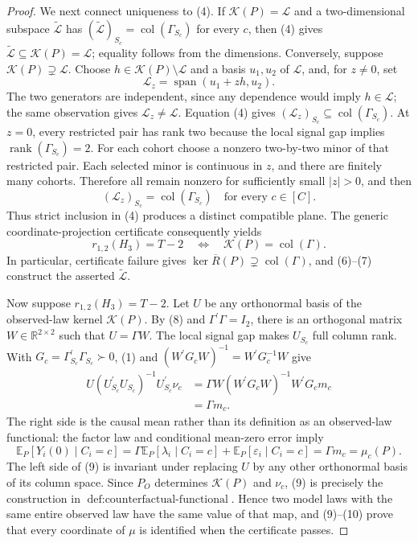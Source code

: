 \documentclass{article}
\begin{document}
\begin{proof}
We next connect uniqueness to (4). If \(\mathcal K(P)=\mathcal L\) and a two-dimensional subspace \(\widetilde{\mathcal L}\) has \((\widetilde{\mathcal L})_{S_c}=\operatorname{col}(\Gamma_{S_c})\) for every \(c\), then (4) gives \(\widetilde{\mathcal L}\subseteq\mathcal K(P)=\mathcal L\); equality follows from the dimensions. Conversely, suppose \(\mathcal K(P)\supsetneq\mathcal L\). Choose \(h\in\mathcal K(P)\setminus\mathcal L\) and a basis \(u_1,u_2\) of \(\mathcal L\), and, for \(z\neq0\), set
\[
\mathcal L_z=\operatorname{span}(u_1+zh,u_2).
\tag{6}
\]
The two generators are independent, since any dependence would imply \(h\in\mathcal L\); the same observation gives \(\mathcal L_z\neq\mathcal L\). Equation (4) gives \((\mathcal L_z)_{S_c}\subseteq\operatorname{col}(\Gamma_{S_c})\). At \(z=0\), every restricted pair has rank two because the local signal gap implies \(\operatorname{rank}(\Gamma_{S_c})=2\). For each cohort choose a nonzero two-by-two minor of that restricted pair. Each selected minor is continuous in \(z\), and there are finitely many cohorts. Therefore all remain nonzero for sufficiently small \(|z|>0\), and then
\[
(\mathcal L_z)_{S_c}=\operatorname{col}(\Gamma_{S_c})
\quad\text{for every }c\in[C].
\tag{7}
\]
Thus strict inclusion in (4) produces a distinct compatible plane. The generic coordinate-projection certificate consequently yields
\[
r_{1,2}(H_3)=T-2
\quad\Longleftrightarrow\quad
\mathcal K(P)=\operatorname{col}(\Gamma).
\tag{8}
\]
In particular, certificate failure gives \(\ker\overline R(P)\supsetneq\operatorname{col}(\Gamma)\), and (6)--(7) construct the asserted \(\widetilde{\mathcal L}\).

Now suppose \(r_{1,2}(H_3)=T-2\). Let \(U\) be any orthonormal basis of the observed-law kernel \(\mathcal K(P)\). By (8) and \(\Gamma^{\prime}\Gamma=I_2\), there is an orthogonal matrix \(W\in\mathbb R^{2\times2}\) such that \(U=\Gamma W\). The local signal gap makes \(U_{S_c}\) full column rank. With \(G_c=\Gamma_{S_c}^{\prime}\Gamma_{S_c}\succ0\), (1) and \((W^{\prime}G_cW)^{-1}=W^{\prime}G_c^{-1}W\) give
\[
\begin{aligned}
U(U_{S_c}^{\prime}U_{S_c})^{-1}U_{S_c}^{\prime}\nu_c
&=\Gamma W(W^{\prime}G_cW)^{-1}W^{\prime}G_cm_c\\
&=\Gamma m_c.
\end{aligned}
\tag{9}
\]
The right side is the causal mean rather than its definition as an observed-law functional: the factor law and conditional mean-zero error imply
\[
\mathbb E_P[Y_i(0)\mid C_i=c]
=\Gamma\mathbb E_P[\lambda_i\mid C_i=c]
+\mathbb E_P[\varepsilon_i\mid C_i=c]
=\Gamma m_c=\mu_c(P).
\tag{10}
\]
The left side of (9) is invariant under replacing \(U\) by any other orthonormal basis of its column space. Since \(P_O\) determines \(\mathcal K(P)\) and \(\nu_c\), (9) is precisely the construction in \(\operatorname{def:counterfactual\text{-}functional}\). Hence two model laws with the same entire observed law have the same value of that map, and (9)--(10) prove that every coordinate of \(\mu\) is identified when the certificate passes.


\end{proof}
\end{document}
